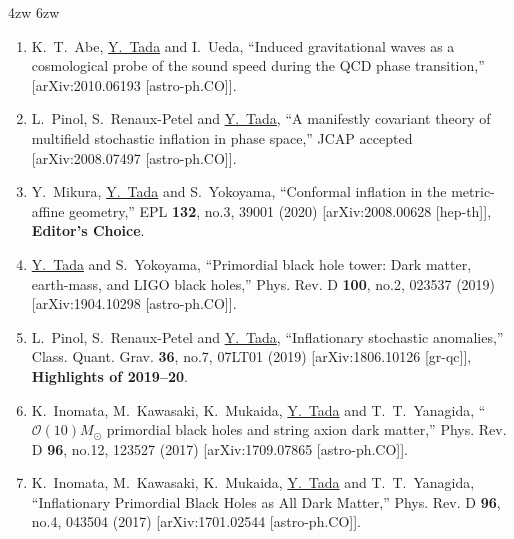 \documentclass[11pt,a4paper,uplatex,dvipdfmx]{ujarticle} 		%
\newcommand{\研究課題名}{曲率ゆらぎの統計と原始ブラックホール量の精密対応}
\newcommand{\研究機関名}{名古屋大学}
\newcommand{\研究代表者氏名}{多田祐一郎}
\newcommand{\研究期間の最終元号年度}{4}  %
\renewcommand{\emph}[1]{{\sffamily\gtfamily\bfseries #1}}
\begin{document}
\begin{description}\itemsep-1mm \itemindent4zw 6zw
	\item[\gtfamily 学術論文 計22報 (以下代表作)]
\end{description}
\vspace{-7mm}
\begin{enumerate}\itemsep-2mm
	\item K.~T.~Abe, \underline{Y.~Tada} and I.~Ueda,
	``Induced gravitational waves as a cosmological probe of the sound speed during the QCD phase transition,''
	[arXiv:2010.06193 [astro-ph.CO]].
	\label{ref: GW QCD}

	\item L.~Pinol, S.~Renaux-Petel and \underline{Y.~Tada},
	``A manifestly covariant theory of multifield stochastic inflation in phase space,''
	JCAP accepted [arXiv:2008.07497 [astro-ph.CO]].
	\label{ref: manifestly covariant}
	
	\item Y.~Mikura, \underline{Y.~Tada} and S.~Yokoyama, 
	``Conformal inflation in the metric-affine geometry,''
	EPL \textbf{132}, no.3, 39001 (2020) 
	[arXiv:2008.00628 [hep-th]], 
	\emph{Editor's Choice}. 
	\label{ref: conformal inflation}
	
	\item \underline{Y.~Tada} and S.~Yokoyama,
	``Primordial black hole tower: Dark matter, earth-mass, and LIGO black holes,''
	Phys. Rev. D \textbf{100}, no.2, 023537 (2019)
	[arXiv:1904.10298 [astro-ph.CO]].
	\label{ref: PBH tower}
	
	\item L.~Pinol, S.~Renaux-Petel and \underline{Y.~Tada}, ``Inflationary stochastic anomalies,''
	Class. Quant. Grav. \textbf{36}, no.7, 07LT01 (2019)
	[arXiv:1806.10126 [gr-qc]],
	\emph{Highlights of 2019--20}.
	\label{ref: stochastic anomaly}
	
	\item K.~Inomata, M.~Kawasaki, K.~Mukaida, \underline{Y.~Tada} and T.~T.~Yanagida,
	``$\mathcal O(10) M_\odot$ primordial black holes and string axion dark matter,''
	Phys. Rev. D \textbf{96}, no.12, 123527 (2017)
	[arXiv:1709.07865 [astro-ph.CO]].
	\label{ref: O(10) PBH}
	
	\item K.~Inomata, M.~Kawasaki, K.~Mukaida, \underline{Y.~Tada} and T.~T.~Yanagida,
	``Inflationary Primordial Black Holes as All Dark Matter,''
	Phys. Rev. D \textbf{96}, no.4, 043504 (2017)
	[arXiv:1701.02544 [astro-ph.CO]].
	\label{ref: PBH DM}


\end{enumerate}
\end{document}
